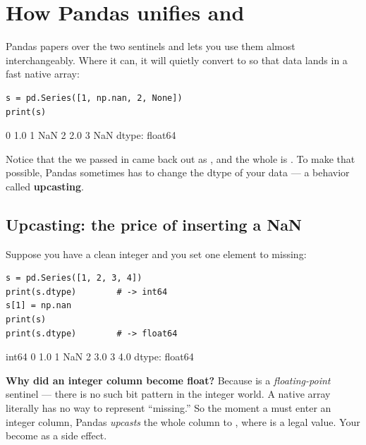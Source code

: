 \documentclass[11pt]{article}
\begin{document}
\section{How Pandas unifies  and }

Pandas papers over the two sentinels and lets you use them almost interchangeably. Where it can, it will quietly convert  to  so that data lands in a fast native array:

\begin{lstlisting}
s = pd.Series([1, np.nan, 2, None])
print(s)
\end{lstlisting}

\begin{outblock}
0    1.0
1    NaN
2    2.0
3    NaN
dtype: float64
\end{outblock}

Notice that the  we passed in came back out as , and the whole  is . To make that possible, Pandas sometimes has to change the dtype of your data --- a behavior called \textbf{upcasting}.

\subsection{Upcasting: the price of inserting a NaN}

Suppose you have a clean integer  and you set one element to missing:

\begin{lstlisting}
s = pd.Series([1, 2, 3, 4])
print(s.dtype)        # -> int64
s[1] = np.nan
print(s)
print(s.dtype)        # -> float64
\end{lstlisting}

\begin{outblock}
int64
0    1.0
1    NaN
2    3.0
3    4.0
dtype: float64
\end{outblock}

\begin{keyidea}
\textbf{Why did an integer column become float?} Because  is a \emph{floating-point} sentinel --- there is no such bit pattern in the integer world. A native  array literally has no way to represent ``missing.'' So the moment a  must enter an integer column, Pandas \emph{upcasts} the whole column to , where  is a legal value. Your  become  as a side effect.
\end{keyidea}
\end{document}
